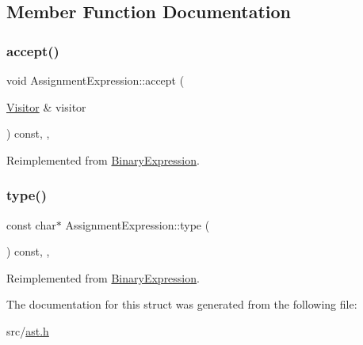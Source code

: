 \subsection{Member Function Documentation}
\mbox{\label{struct_assignment_expression_ac3d1a00abf176502782937938f629a9f}} 
\subsubsection{\texorpdfstring{accept()}{accept()}}
{\footnotesize\ttfamily void Assignment\+Expression\+::accept (\begin{DoxyParamCaption}\item[{\hyperlink{struct_visitor}{Visitor} \&}]{visitor }\end{DoxyParamCaption}) const\hspace{0.3cm}{\ttfamily [inline]}, {\ttfamily [override]}, {\ttfamily [virtual]}}



Reimplemented from \hyperlink{struct_binary_expression_af8318bd8b21b4bbca064e8a6086a10a0}{Binary\+Expression}.

\mbox{\label{struct_assignment_expression_a9c5da03eec8d7c10f1127ec5029de263}} 
\subsubsection{\texorpdfstring{type()}{type()}}
{\footnotesize\ttfamily const char$\ast$ Assignment\+Expression\+::type (\begin{DoxyParamCaption}{ }\end{DoxyParamCaption}) const\hspace{0.3cm}{\ttfamily [inline]}, {\ttfamily [override]}, {\ttfamily [virtual]}}



Reimplemented from \hyperlink{struct_binary_expression_a9ab583e823bac39ed8fd8eb34747ac9f}{Binary\+Expression}.



The documentation for this struct was generated from the following file\+:\begin{DoxyCompactItemize}
\item 
src/\hyperlink{ast_8h}{ast.\+h}\end{DoxyCompactItemize}

